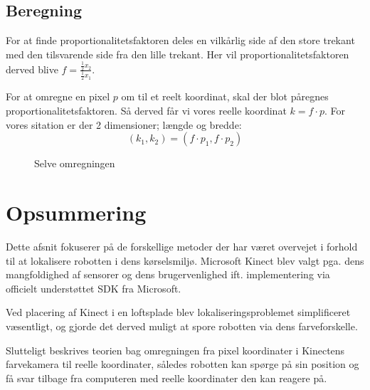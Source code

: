 \subsection{Beregning}
For at finde proportionalitetsfaktoren deles en vilkårlig side af den store trekant med den tilsvarende side fra den lille trekant.
Her vil proportionalitetsfaktoren derved blive $f = \frac{\frac{1}{2}x_2}{\frac{1}{2}x_1}$.

For at omregne en pixel $p$ om til et reelt koordinat, skal der blot påregnes proportionalitetsfaktoren.
Så derved får vi vores reelle koordinat $k = f \cdot p$.
For vores sitation er der 2 dimensioner; længde og bredde: \begin{equation*}
(k_1,k_2) = (f \cdot p_1, f \cdot p_2)
\end{equation*}


\begin{figure}[h]
\centering
{}
\caption{Selve omregningen}
\label{fig:udregningstrekant}
\end{figure}

\clearpage
\section{Opsummering}
Dette afsnit fokuserer på de forskellige metoder der har været overvejet i forhold til at lokalisere robotten i dens kørselsmiljø.
Microsoft Kinect blev valgt pga. dens mangfoldighed af sensorer og dens brugervenlighed ift. implementering via officielt understøttet SDK fra Microsoft.

Ved placering af Kinect i en loftsplade blev lokaliseringsproblemet simplificeret væsentligt, og gjorde det derved muligt at spore robotten via dens farveforskelle.

Slutteligt beskrives teorien bag omregningen fra pixel koordinater i Kinectens farvekamera til reelle koordinater, således robotten kan spørge på sin position og få svar tilbage fra computeren med reelle koordinater den kan reagere på.